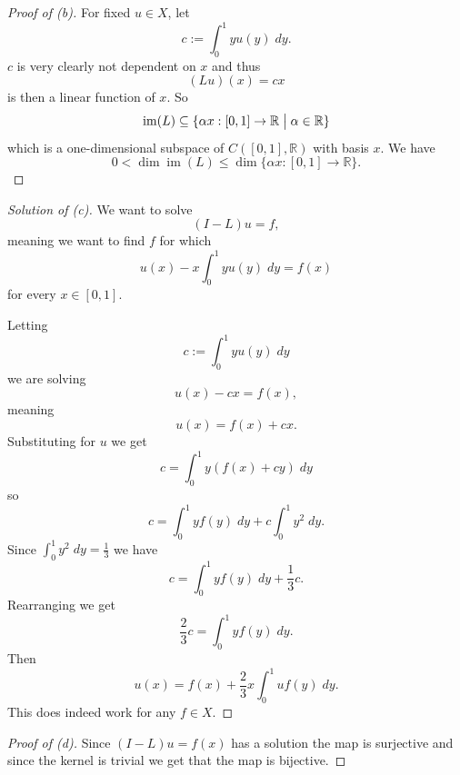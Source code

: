 \begin{proof}[Proof of (b)]
    For fixed $u \in X$, let 
    \[
        c := \int_0^1 yu(y) \;dy.
    \]
    $c$ is very clearly not dependent on $x$ and thus 
    \[
        (Lu)(x) = cx 
    \]
    is then a linear function of $x$. So 
    \[
        \operatorname{im}(L) 
        \subseteq 
        \{\alpha x : [0,1] \to \mathbb R \bigm| \alpha \in \mathbb R\}
    \]
    which is a one-dimensional subspace 
    of $C([0,1], \mathbb R)$ with basis $x$. We have 
    \[
        0 < \dim \operatorname{im}(L) \leq \dim \{\alpha x : [0,1]
        \to \mathbb R\}.
    \]
\end{proof}
\begin{proof}[Solution of (c)]
    We want to solve 
    \[
         (I-L)u = f, 
    \]
    meaning we want to find $f$ for which 
    \[
        u(x) - x \int_0^1 yu(y) \; dy = f(x)
    \]
    for every $x \in [0,1]$.

    Letting 
    \[
        c := \int_0^1 yu(y) \; dy
    \]
    we are solving 
    \[
        u(x) - cx = f(x), 
    \]
    meaning 
    \[
        u(x) = f(x) + cx.
    \]
    Substituting for $u$ we get 
    \[
        c = \int_0^1 y(f(x) + cy) \;dy 
    \]
    so 
    \[
        c = \int_0^1 yf(y) \; dy + 
        c\int_0^1 y^2 \; dy.
    \]
    Since $\int_0^1 y^2 \; dy = \frac{1}{3}$ we have 
    \[
        c = \int_0^1 y f(y) \; dy + \frac{1}{3}c.
    \]
    Rearranging we get 
    \[
        \frac{2}{3}c = \int_0^1 y f(y) \; dy.
    \]
    Then 
    \[
        u(x) = f(x) + \frac{2}{3}x \int_0^1 uf(y) \; dy.
    \]
    This does indeed work for any $f \in X$.
\end{proof}

\begin{proof}[Proof of (d)]
    Since $(I-L)u = f(x)$ has a solution the 
    map is surjective and since the kernel is trivial we 
    get that the map is bijective.
\end{proof}


